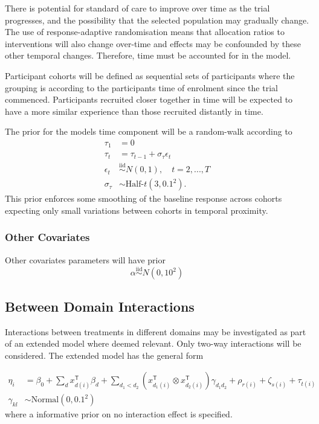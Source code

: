 \documentclass[
  11pt,
]{article}
\begin{document}
There is potential for standard of care to improve over time as the trial progresses, and the possibility that the selected population may gradually change.
The use of response-adaptive randomisation means that allocation ratios to interventions will also change over-time and effects may be confounded by these other temporal changes.
Therefore, time must be accounted for in the model.

Participant cohorts will be defined as sequential sets of participants where the grouping is according to the participants time of enrolment since the trial commenced.
Participants recruited closer together in time will be expected to have a more similar experience than those recruited distantly in time.

The prior for the models time component will be a random-walk according to
\[
\begin{aligned}
\tau_1 &= 0 \\
\tau_t &= \tau_{t-1} + \sigma_\tau\epsilon_t \\
\epsilon_t &\overset{\text{iid}}{\sim} N(0, 1),\quad t=2,...,T \\
\sigma_\tau &\sim \text{Half-}t(3, 0.1^2).
\end{aligned}
\]
This prior enforces some smoothing of the baseline response across cohorts expecting only small variations between cohorts in temporal proximity.

\hypertarget{other-covariates}{%
\subsubsection{Other Covariates}\label{other-covariates}}

Other covariates parameters will have prior
\[
\alpha \overset{\text{iid}}{\sim} N(0, 10^2)
\]

\hypertarget{between-domain-interactions}{%
\subsection{Between Domain Interactions}\label{between-domain-interactions}}

Interactions between treatments in different domains may be investigated as part of an extended model where deemed relevant.
Only two-way interactions will be considered.
The extended model has the general form

\[
\begin{aligned}
\eta_i &= \beta_0 + \sum_{d} x_{d(i)}^{\mathsf{T}}\beta_d + 
\sum_{d_1<d_2}\left(x_{d_1(i)}^{\mathsf{T}}\otimes x_{d_2(i)}^{\mathsf{T}}\right)\gamma_{d_1d_2} + 
\rho_{r(i)} + \zeta_{s(i)} + \tau_{t(i)} \\
\gamma_{kl} &\sim \text{Normal}(0, 0.1^2)
\end{aligned}
\]
where a informative prior on no interaction effect is specified.
\end{document}
